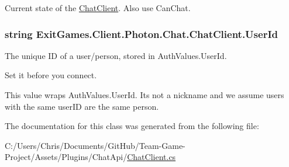 Current state of the \hyperlink{class_exit_games_1_1_client_1_1_photon_1_1_chat_1_1_chat_client}{Chat\+Client}. Also use Can\+Chat.

\subsubsection[{\texorpdfstring{User\+Id}{UserId}}]{\setlength{\rightskip}{0pt plus 5cm}string Exit\+Games.\+Client.\+Photon.\+Chat.\+Chat\+Client.\+User\+Id\hspace{0.3cm}{\ttfamily [get]}}\hypertarget{class_exit_games_1_1_client_1_1_photon_1_1_chat_1_1_chat_client_a8f757bc4e9f4038dc388a8fee3f47150}{}\label{class_exit_games_1_1_client_1_1_photon_1_1_chat_1_1_chat_client_a8f757bc4e9f4038dc388a8fee3f47150}


The unique ID of a user/person, stored in Auth\+Values.\+User\+Id. 

Set it before you connect.

This value wraps Auth\+Values.\+User\+Id. It\textquotesingle{}s not a nickname and we assume users with the same user\+ID are the same person.

The documentation for this class was generated from the following file\+:\begin{DoxyCompactItemize}
\item 
C\+:/\+Users/\+Chris/\+Documents/\+Git\+Hub/\+Team-\/\+Game-\/\+Project/\+Assets/\+Plugins/\+Chat\+Api/\hyperlink{_chat_client_8cs}{Chat\+Client.\+cs}\end{DoxyCompactItemize}
